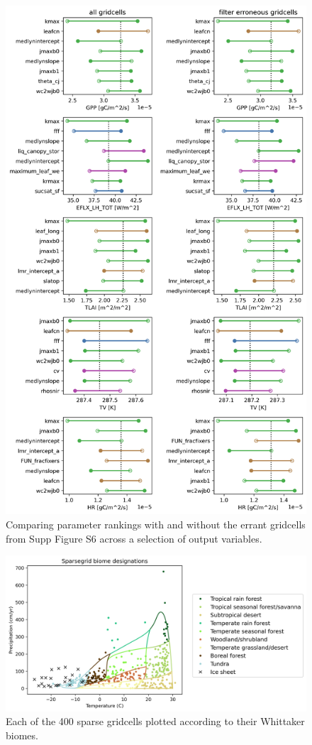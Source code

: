 \documentclass[11pt]{article}
\begin{document}
\begin{figure}[h]
\centering
\includegraphics[width=30pc]{../figs/supp/AF2095_rankings.png}
\caption{Comparing parameter rankings with and without the errant gridcells from Supp Figure S6 across a selection of output variables.}
\label{supp:abug}
\end{figure}


\begin{figure}[h]
\centering
\includegraphics[width=40pc]{../figs/supp/biome_tp.png}
\caption{Each of the 400 sparse gridcells plotted according to their Whittaker biomes.}
\label{supp:whit1}
\end{figure}
\end{document}
